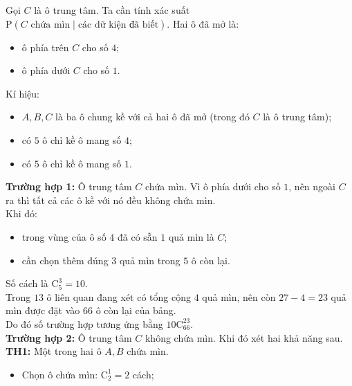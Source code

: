 \begin{ex}
{\begin{center}
	\end{center}
Gọi $C$ là ô trung tâm. Ta cần tính xác suất
$\mathrm{P}(C \text{ chứa mìn}\mid \text{các dữ kiện đã biết})$.
Hai ô đã mở là:
\begin{itemize}
	\item ô phía trên $C$ cho số $4$;
	\item ô phía dưới $C$ cho số $1$.
\end{itemize}
Kí hiệu:
\begin{itemize}
	\item $A,B,C$ là ba ô chung kề với cả hai ô đã mở (trong đó $C$ là ô trung tâm);
	\item có $5$ ô chỉ kề ô mang số $4$;
	\item có $5$ ô chỉ kề ô mang số $1$.
\end{itemize}
\textbf{Trường hợp 1:} Ô trung tâm $C$ chứa mìn.
Vì ô phía dưới cho số $1$, nên ngoài $C$ ra thì tất cả các ô kề với nó đều không chứa mìn.\\
Khi đó:
\begin{itemize}
	\item trong vùng của ô số $4$ đã có sẵn $1$ quả mìn là $C$;
	\item cần chọn thêm đúng $3$ quả mìn trong $5$ ô còn lại.
\end{itemize}
Số cách là $\mathrm{C}^{3}_{5}=10$.\\
Trong $13$ ô liên quan đang xét có tổng cộng $4$ quả mìn, nên còn $27-4=23$ quả mìn được đặt vào $66$ ô còn lại của bảng.\\
Do đó số trường hợp tương ứng bằng $10\mathrm{C}_{66}^{23}$.\\
\textbf{Trường hợp 2:} Ô trung tâm $C$ không chứa mìn. Khi đó xét hai khả năng sau.\\
\textbf{TH1:} Một trong hai ô $A,B$ chứa mìn.\\
\begin{itemize}
	\item Chọn ô chứa mìn: $\mathrm{C}_2^1=2$ cách;

\end{itemize}}
\end{ex}
